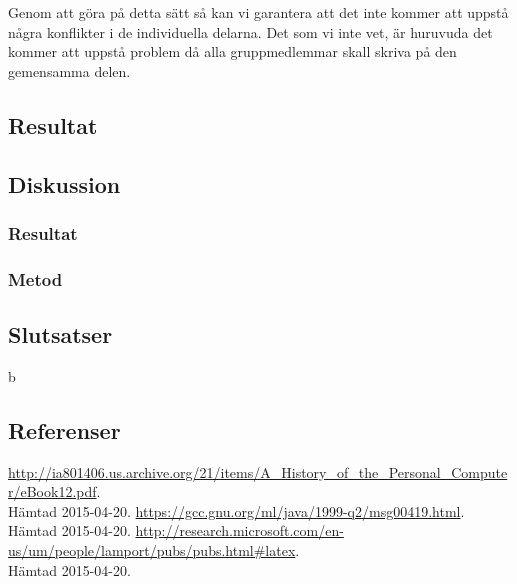 Genom att göra på detta sätt så kan vi garantera att det inte kommer att uppstå några konflikter i de individuella delarna.
Det som vi inte vet, är huruvuda det kommer att uppstå problem då alla gruppmedlemmar skall skriva på den gemensamma delen.

\subsection{Resultat}
\subsection{Diskussion}
\subsubsection{Resultat}
\subsubsection{Metod}
\subsection{Slutsatser}b
\subsection{Referenser}
\begin{thebibliography}{9}
\url{http://ia801406.us.archive.org/21/items/A\_History\_of\_the\_Personal\_Computer/eBook12.pdf}.\\
 Hämtad 2015-04-20.
\url{https://gcc.gnu.org/ml/java/1999-q2/msg00419.html}.\\
 Hämtad 2015-04-20.
\url{http://research.microsoft.com/en-us/um/people/lamport/pubs/pubs.html\#latex}.\\
 Hämtad 2015-04-20.
 
\end{thebibliography}